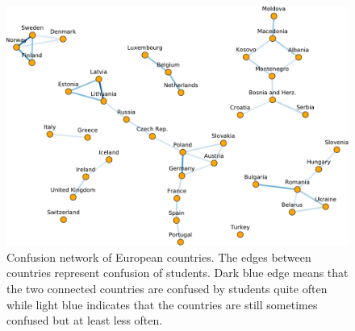 \begin{figure}[htbp]
  \centering
  \includegraphics[width=\textwidth]{img/confusion-network}
  \caption{Confusion network of European countries. The edges between countries represent confusion of students. Dark blue edge means that the two connected countries are confused by students quite often while light blue indicates that the countries are still sometimes confused but at least less often.}
  \label{confusion-network}
\end{figure}
